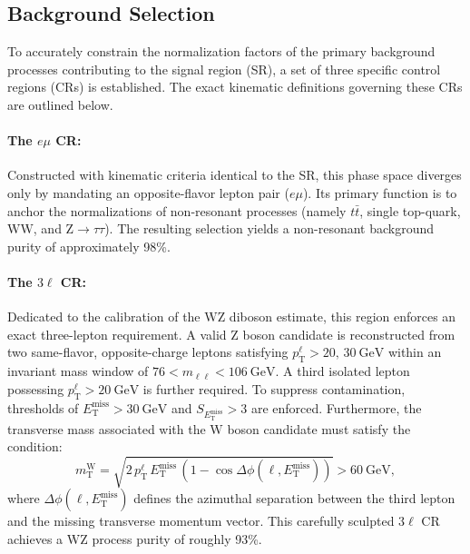 \subsection{Background Selection} %
\label{sec:monoZ_bkg}

To accurately constrain the normalization factors of the primary background processes contributing to the signal region (SR), a set of three specific control regions (CRs) is established. The exact kinematic definitions governing these CRs are outlined below.

\paragraph{The $e\mu$ CR:}
Constructed with kinematic criteria identical to the SR, this phase space diverges only by mandating an opposite-flavor lepton pair ($e\mu$). Its primary function is to anchor the normalizations of non-resonant processes (namely $t\bar{t}$, single top-quark, $\text{WW}$, and $\text{Z} \to \tau\tau$). The resulting selection yields a non-resonant background purity of approximately 98\%.

\paragraph{The $3\ell$ CR:}
Dedicated to the calibration of the $\text{WZ}$ diboson estimate, this region enforces an exact three-lepton requirement. A valid $\text{Z}$ boson candidate is reconstructed from two same-flavor, opposite-charge leptons satisfying $p_{\text{T}}^{\ell} > 20,\,30~\text{GeV}$ within an invariant mass window of $76 < m_{\ell\ell} < 106~\text{GeV}$. A third isolated lepton possessing $p_{\text{T}}^{\ell} > 20~\text{GeV}$ is further required. To suppress contamination, thresholds of $E_{\text{T}}^{\text{miss}} > 30~\text{GeV}$ and $S_{E_{\text{T}}^{\text{miss}}} > 3$ are enforced. Furthermore, the transverse mass associated with the $\text{W}$ boson candidate must satisfy the condition:
\begin{equation}
m_{\text{T}}^{\text{W}} =
\sqrt{
2\,p_{\text{T}}^{\ell}\,
E_{\text{T}}^{\text{miss}}\,
\left(1 - \cos\Delta\phi(\ell, E_{\text{T}}^{\text{miss}})\right)
}
> 60~\text{GeV},
\end{equation}
where $\Delta\phi(\ell, E_{\text{T}}^{\text{miss}})$ defines the azimuthal separation between the third lepton and the missing transverse momentum vector. This carefully sculpted $3\ell$ CR achieves a $\text{WZ}$ process purity of roughly 93\%.

